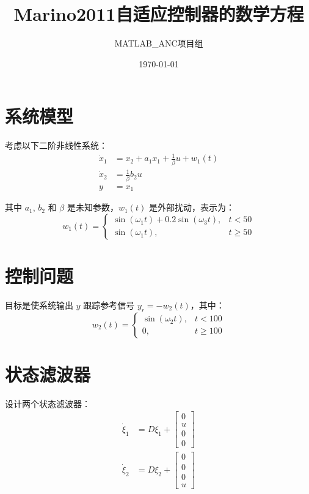 \documentclass{article}
\title{Marino2011自适应控制器的数学方程}
\author{MATLAB\_ANC项目组}
\date{\today}
\begin{document}
\maketitle

\section{系统模型}

考虑以下二阶非线性系统：
\begin{align}
\dot{x}_1 &= x_2 + a_1 x_1 + \frac{1}{\beta}u + w_1(t) \\
\dot{x}_2 &= \frac{1}{\beta}b_2 u \\
y &= x_1
\end{align}

其中 $a_1$, $b_2$ 和 $\beta$ 是未知参数，$w_1(t)$ 是外部扰动，表示为：
\begin{equation}
w_1(t) = 
\begin{cases}
\sin(\omega_1 t) + 0.2\sin(\omega_3 t), & t < 50 \\
\sin(\omega_1 t), & t \geq 50
\end{cases}
\end{equation}

\section{控制问题}

目标是使系统输出 $y$ 跟踪参考信号 $y_r = -w_2(t)$，其中：
\begin{equation}
w_2(t) = 
\begin{cases}
\sin(\omega_2 t), & t < 100 \\
0, & t \geq 100
\end{cases}
\end{equation}

\section{状态滤波器}

设计两个状态滤波器：
\begin{align}
\dot{\xi}_1 &= D\xi_1 + 
\begin{bmatrix} 
0 \\ u \\ 0 \\ 0
\end{bmatrix} \\
\dot{\xi}_2 &= D\xi_2 + 
\begin{bmatrix} 
0 \\ 0 \\ 0 \\ u
\end{bmatrix}
\end{align}
\end{document}
